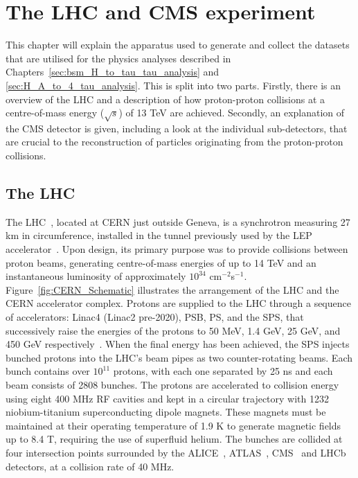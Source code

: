 \chapter{The LHC and CMS experiment}
\label{sec:cms}

This chapter will explain the apparatus used to generate and collect the datasets that are utilised for the physics analyses described in Chapters~\ref{sec:bsm_H_to_tau_tau_analysis} and \ref{sec:H_A_to_4_tau_analysis}.
This is split into two parts.
Firstly, there is an overview of the \ac{LHC} and a description of how proton-proton collisions at a centre-of-mass energy ($\sqrt{s}$) of 13 TeV are achieved.
Secondly, an explanation of the \ac{CMS} detector is given, including a look at the individual sub-detectors, that are crucial to the reconstruction of particles originating from the proton-proton collisions.

\section{The LHC}

The \ac{LHC}~\cite{Evans:2008zzb}, located at \ac{CERN} just outside Geneva, is a synchrotron measuring 27 km in circumference, installed in the tunnel previously used by the \ac{LEP} accelerator~\cite{203828}. 
Upon design, its primary purpose was to provide collisions between proton beams, generating centre-of-mass energies of up to 14 TeV and an instantaneous luminosity of approximately $10^{34}$ cm$^{−2}$s$^{−1}$. 
Figure~\ref{fig:CERN_Schematic} illustrates the arrangement of the \ac{LHC} and the \ac{CERN} accelerator complex. 
Protons are supplied to the \ac{LHC} through a sequence of accelerators: Linac4 (Linac2 pre-2020), \ac{PSB}, \ac{PS}, and the \ac{SPS}, that successively raise the energies of the protons to 50 MeV, 1.4 GeV, 25 GeV, and 450 GeV respectively~\cite{Benedikt:2004wm}. 
When the final energy has been achieved, the \ac{SPS} injects bunched protons into the \ac{LHC}'s beam pipes as two counter-rotating beams. 
Each bunch contains over $10^{11}$ protons, with each one separated by 25 ns and each beam consists of 2808 bunches. 
The protons are accelerated to collision energy using eight 400 MHz \ac{RF} cavities and kept in a circular trajectory with 1232 niobium-titanium superconducting dipole magnets. 
These magnets must be maintained at their operating temperature of 1.9 K to generate magnetic fields up to 8.4 T, requiring the use of superfluid helium. 
The bunches are collided at four intersection points surrounded by the ALICE~\cite{ALICE:2008ngc}, ATLAS~\cite{ATLAS:2008xda}, CMS~\cite{CMS_Setup} and LHCb~\cite{LHCb:2008vvz} detectors, at a collision rate of 40 MHz. \\

